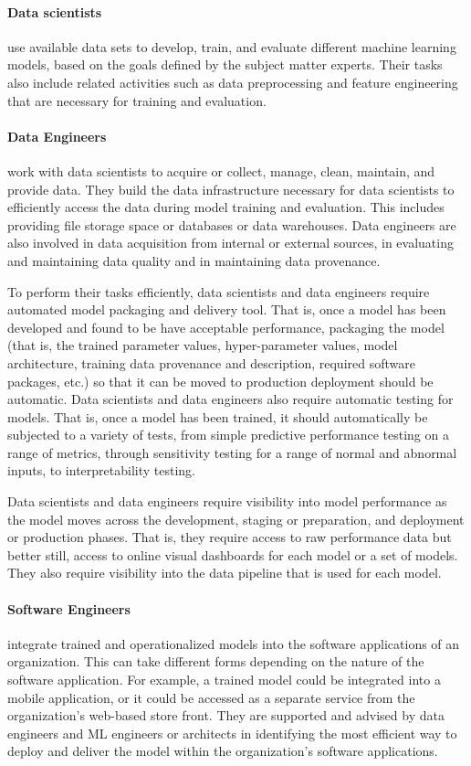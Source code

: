 \paragraph*{Data scientists} use available data sets to develop, train, and evaluate different machine learning models, based on the goals defined by the subject matter experts. Their tasks also include related activities such as data preprocessing and feature engineering that are necessary for training and evaluation. 

\paragraph*{Data Engineers} work with data scientists to acquire or collect, manage, clean, maintain, and provide data. They build the data infrastructure necessary for data scientists to efficiently access the data during model training and evaluation. This includes providing file storage space or databases or data warehouses. Data engineers are also involved in data acquisition from internal or external sources, in evaluating and maintaining data quality and in maintaining data provenance.

To perform their tasks efficiently, data scientists and data engineers require automated model packaging and delivery tool. That is, once a model has been developed and found to be have acceptable performance, packaging the model (that is, the trained parameter values, hyper-parameter values, model architecture, training data provenance and description, required software packages, etc.) so that it can be moved to production deployment should be automatic. Data scientists and data engineers also require automatic testing for models. That is, once a model has been trained, it should automatically be subjected to a variety of tests, from simple predictive performance testing on a range of metrics, through sensitivity testing for a range of normal and abnormal inputs, to interpretability testing. 

Data scientists and data engineers require visibility into model performance as the model moves across the development, staging or preparation, and deployment or production phases. That is, they require access to raw performance data but better still, access to online visual dashboards for each model or a set of models. They also require visibility into the data pipeline that is used for each model.

\paragraph*{Software Engineers} integrate trained and operationalized models into the software applications of an organization. This can take different forms depending on the nature of the software application. For example, a trained model could be integrated into a mobile application, or it could be accessed as a separate service from the organization's web-based store front. They are supported and advised by data engineers and ML engineers or architects in identifying the most efficient way to deploy and deliver the model within the organization's software applications. 

